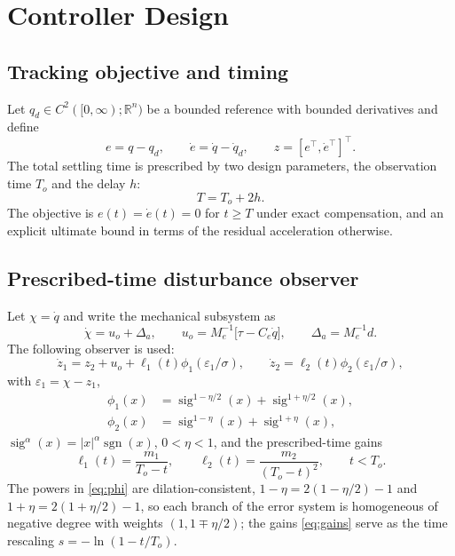 \section{Controller Design}\label{sec:control}

\subsection{Tracking objective and timing}
Let $q_d\in C^2([0,\infty);\mathbb R^n)$ be a bounded reference with bounded
derivatives and define
\begin{equation}
 e=q-q_d,\qquad \dot e=\dot q-\dot q_d,\qquad z=[e^\top,\dot e^\top]^\top .
 \label{eq:errors}
\end{equation}
The total settling time is prescribed by two design parameters, the
observation time $T_o$ and the delay $h$:
\begin{equation}
 T=T_o+2h .
 \label{eq:prescribed}
\end{equation}
The objective is $e(t)=\dot e(t)=0$ for $t\ge T$ under exact compensation,
and an explicit ultimate bound in terms of the residual acceleration otherwise.

\subsection{Prescribed-time disturbance observer}\label{sec:ptdo}
Let $\chi=\dot q$ and write the mechanical subsystem as
\begin{equation}
 \dot\chi=u_o+\Delta_a,\qquad
 u_o=M_e^{-1}\bigl[\tau-C_e\dot q\bigr],\qquad
 \Delta_a=M_e^{-1}d .
 \label{eq:channel}
\end{equation}
The following observer is used:
\begin{equation}
 \dot z_1=z_2+u_o+\ell_1(t)\phi_1(\varepsilon_1/\sigma),\qquad
 \dot z_2=\ell_2(t)\phi_2(\varepsilon_1/\sigma),
 \label{eq:ptdo}
\end{equation}
with $\varepsilon_1=\chi-z_1$,
\begin{equation}
\begin{aligned}
 \phi_1(x)&=\operatorname{sig}^{1-\eta/2}(x)+\operatorname{sig}^{1+\eta/2}(x),\\
 \phi_2(x)&=\operatorname{sig}^{1-\eta}(x)+\operatorname{sig}^{1+\eta}(x),
\end{aligned}
 \label{eq:phi}
\end{equation}
$\operatorname{sig}^{\alpha}(x)=|x|^{\alpha}\operatorname{sgn}(x)$,
$0<\eta<1$, and the prescribed-time gains
\begin{equation}
 \ell_1(t)=\frac{m_1}{T_o-t},\qquad
 \ell_2(t)=\frac{m_2}{(T_o-t)^2},\qquad t<T_o .
 \label{eq:gains}
\end{equation}
The powers in \eqref{eq:phi} are dilation-consistent,
$1-\eta=2(1-\eta/2)-1$ and $1+\eta=2(1+\eta/2)-1$, so each branch of the error
system is homogeneous of negative degree with weights $(1,1\mp\eta/2)$; the
gains \eqref{eq:gains} serve as the time rescaling $s=-\ln(1-t/T_o)$.

